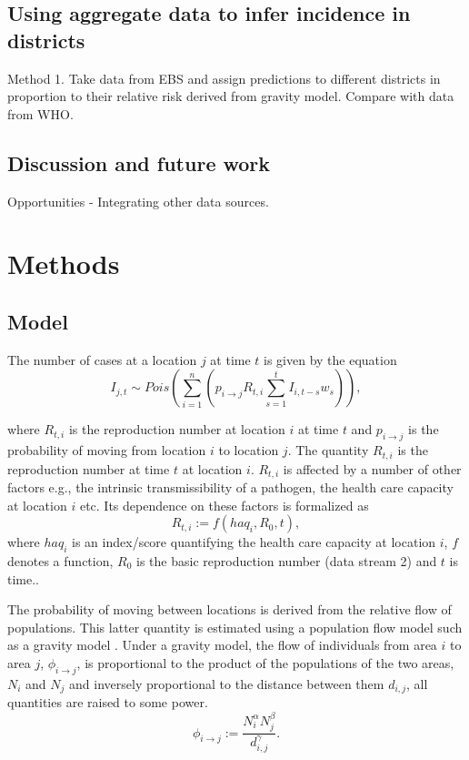 \documentclass[a4paper,12pt]{article}
\begin{document}
 \subsection*{Using aggregate data to infer incidence in districts}
 Method 1. Take data from EBS and assign predictions to different
 districts in proportion to their relative risk derived from gravity
 model. Compare with data from WHO.

 \subsection*{Discussion and future work}
 Opportunities - Integrating other data sources.

 \section*{Methods}
 \subsection*{Model}
 The number of cases at a location \(j\) at time \(t\) is given by the equation
\[
  I_{j, t} \sim Pois\left( \sum_{i = 1}^{n} {\left( p_{i \rightarrow j}
  R_{t, i} \sum_{s = 1}^{t}{I_{i, t - s} w_{s}}\right)} \right),
\]

where \(R_{t, i}\) is the reproduction number at location \(i\) at time
\(t\) and \(p_{i \rightarrow j}\) is the probability of moving from
location \(i\) to location \(j\). The quantity $R_{t, i}$ is the
reproduction number at time $t$ at location $i$. $R_{t, i}$ is
affected by a number of other factors e.g., the intrinsic
transmissibility of a pathogen, the health care capacity at location
$i$ etc. Its dependence on these factors is formalized as
\[ R_{t, i} := f(haq_i, R_0, t),\]
where $haq_i$ is an index/score quantifying the health care capacity at location 
$i$, $f$ denotes a function, $R_0$ is the basic reproduction number (data stream 2) and $t$ is time..

The probability of moving between locations is derived from the
relative flow of populations.
This latter quantity is estimated using a population flow
model such as a gravity model \citep{GROSCHE2007175}. Under a gravity model, the flow of individuals from area \(i\) to area \(j\),
\(\phi_{i \rightarrow j}\), is proportional to the product of the
populations of the two areas, \(N_i\) and \(N_j\) and inversely
proportional to the distance between them \(d_{i, j}\), all quantities
are raised to some power.
\[
  \phi_{i \rightarrow j} :=  \frac{N_i^{\alpha}N_j^{\beta}}{d_{i, j}^{\gamma}}.
\]
\end{document}
